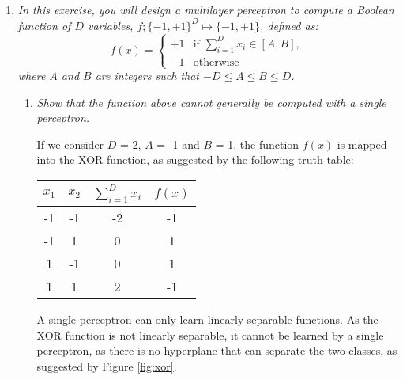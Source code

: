 \documentclass[12pt]{article}
\begin{document}
\begin{enumerate}[leftmargin=\labelsep]
    \item \textit{In this exercise, you will design a multilayer perceptron to compute a Boolean function of $D$ variables, $f; \{-1, +1\}^D \mapsto \{-1, +1\}$, defined as:}
          \begin{equation*}
              f(x) = \begin{cases}
                  +1 & \text{if } \sum\limits_{i=1}^D x_i \in [A, B], \\
                  -1 & \text{otherwise}
              \end{cases}
          \end{equation*}
          \textit{where $A$ and $B$ are integers such that $-D \leq A \leq B \leq D$.}

          \begin{enumerate}[label=\alph*)]
              \item \textit{Show that the function above cannot generally be computed with a single
                        perceptron.}

                    \vspace{12pt}

                    If we consider $D$ = 2, $A$ = -1 and $B$ = 1, the function $f(x)$ is mapped into the XOR function, as suggested by the following truth table:

                    \begin{table}[H]
                        \centering
                        \begin{tabular}{|c|c|c|c|}
                            \hline
                            $x_1$ & $x_2$ & $\sum\limits_{i=1}^D x_i$ & $f(x)$ \\ \hline
                            -1    & -1    & -2                        & -1     \\ \hline
                            -1    & 1     & 0                         & 1      \\ \hline
                            1     & -1    & 0                         & 1      \\ \hline
                            1     & 1     & 2                         & -1     \\ \hline
                        \end{tabular}
                    \end{table}

                    A single perceptron can only learn linearly separable functions. As the XOR function is not linearly separable, it cannot be learned by a single perceptron, as there is no hyperplane that can separate the two classes, as suggested by Figure \ref{fig:xor}.


\end{enumerate}
\end{enumerate}
\end{document}
